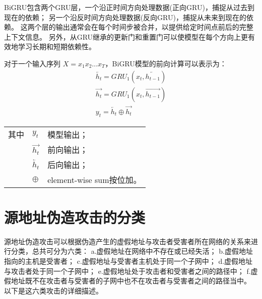 BiGRU包含两个GRU层，一个沿正时间方向处理数据(正向GRU)，捕捉从过去到现在的依赖；
另一个沿反时间方向处理数据(反向GRU)，捕捉从未来到现在的依赖。
这两个层的输出通常会在每个时间步被合并，以提供给定时间点前后的完整上下文信息。
另外，从GRU继承的更新门和重置门可以使模型在每个方向上更有效地学习长期和短期依赖性。

对于一个输入序列 $X = x_1 x_2 \dots x_T$，BiGRU模型的前向计算可以表示为：
\begin{gather}
  \overleftarrow{h_t} = GRU_1(x_t,\overleftarrow{h_{t-1}}) \label{eq:bigru_htleft} \\
  \overrightarrow{h_t} = GRU_1(x_t,\overrightarrow{h_{t-1}}) \label{eq:bigru_htright} \\
  y_t = \overleftarrow{h_t} \oplus \overrightarrow{h_t} \label{eq:bigru_out}
\end{gather}
\begin{flushleft}
  \renewcommand\arraystretch{1.25}
  \begin{tabularx}{\textwidth}{@{}>{\normalsize\rm}l@{\quad}>{\normalsize\rm}l@{——}>{\normalsize\rm}X@{}}
  其中
  &  $y_t$ &模型输出；\\
  &  $\overrightarrow{h_t}$ &前向输出；\\
  &  $\overleftarrow{h_t} $ &后向输出；\\
  &  $\oplus$ & element-wise sum按位加。\\
  \end{tabularx}\vspace{.5ex}%
\end{flushleft}

\section{源地址伪造攻击的分类}

源地址伪造攻击可以根据伪造产生的虚假地址与攻击者受害者所在网络的关系来进行分类，总共可分为六类：
a.虚假地址在网络中不存在或已经失活；
b.虚假地址指向的主机是受害者；
c.虚假地址与受害者主机处于同一个子网中；
d.虚假地址与攻击者处于同一个子网中；
e.虚假地址处于攻击者和受害者之间的路径中；
f.虚假地址既不在攻击者与受害者的子网中也不在攻击者与受害者之间的路径当中\cite{lee2021classification}。
以下是这六类攻击的详细描述。

